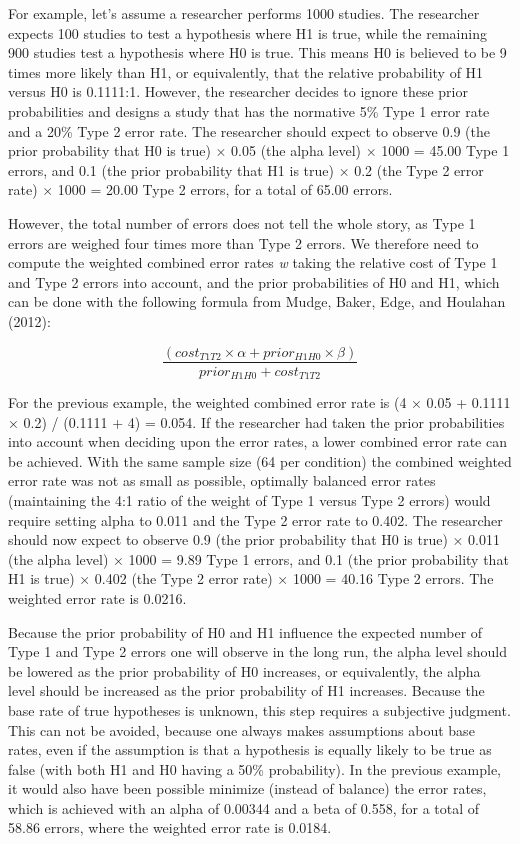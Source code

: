 \documentclass[
  english,
  ,man, a4paper,floatsintext]{apa6}
\begin{document}
For example, let's assume a researcher performs 1000 studies. The researcher expects 100 studies to test a hypothesis where H1 is true, while the remaining 900 studies test a hypothesis where H0 is true. This means H0 is believed to be 9 times more likely than H1, or equivalently, that the relative probability of H1 versus H0 is 0.1111:1. However, the researcher decides to ignore these prior probabilities and designs a study that has the normative 5\% Type 1 error rate and a 20\% Type 2 error rate. The researcher should expect to observe 0.9 (the prior probability that H0 is true) × 0.05 (the alpha level) × 1000 = 45.00 Type 1 errors, and 0.1 (the prior probability that H1 is true) × 0.2 (the Type 2 error rate) × 1000 = 20.00 Type 2 errors, for a total of 65.00 errors.

However, the total number of errors does not tell the whole story, as Type 1 errors are weighed four times more than Type 2 errors. We therefore need to compute the weighted combined error rates \emph{w} taking the relative cost of Type 1 and Type 2 errors into account, and the prior probabilities of H0 and H1, which can be done with the following formula from Mudge, Baker, Edge, and Houlahan (2012):

\begin{equation}
\frac{(cost_{T1T2} \times \alpha + prior_{H1H0} \times \beta)}{prior_{H1H0}+cost_{T1T2}}
\label{eq:minimize}
\end{equation}

For the previous example, the weighted combined error rate is (4 × 0.05 + 0.1111 × 0.2) / (0.1111 + 4) = 0.054. If the researcher had taken the prior probabilities into account when deciding upon the error rates, a lower combined error rate can be achieved. With the same sample size (64 per condition) the combined weighted error rate was not as small as possible, optimally balanced error rates (maintaining the 4:1 ratio of the weight of Type 1 versus Type 2 errors) would require setting alpha to 0.011 and the Type 2 error rate to 0.402. The researcher should now expect to observe 0.9 (the prior probability that H0 is true) × 0.011 (the alpha level) × 1000 = 9.89 Type 1 errors, and 0.1 (the prior probability that H1 is true) × 0.402 (the Type 2 error rate) × 1000 = 40.16 Type 2 errors. The weighted error rate is 0.0216.

Because the prior probability of H0 and H1 influence the expected number of Type 1 and Type 2 errors one will observe in the long run, the alpha level should be lowered as the prior probability of H0 increases, or equivalently, the alpha level should be increased as the prior probability of H1 increases. Because the base rate of true hypotheses is unknown, this step requires a subjective judgment. This can not be avoided, because one always makes assumptions about base rates, even if the assumption is that a hypothesis is equally likely to be true as false (with both H1 and H0 having a 50\% probability). In the previous example, it would also have been possible minimize (instead of balance) the error rates, which is achieved with an alpha of 0.00344 and a beta of 0.558, for a total of 58.86 errors, where the weighted error rate is 0.0184.
\end{document}

